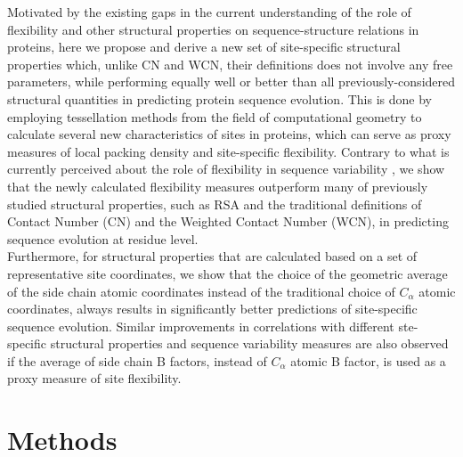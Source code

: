 \documentclass[11pt]{article}
\begin{document}
    Motivated by the existing gaps in the current understanding of the role of flexibility and other structural properties on sequence-structure relations in proteins, here we propose and derive a new set of site-specific structural properties which, unlike CN and WCN, their definitions does not involve any free parameters, while performing equally well or better than all previously-considered structural quantities in predicting protein sequence evolution. This is done by employing tessellation methods from the field of computational geometry to calculate several new characteristics of sites in proteins, which can serve as proxy measures of local packing density and site-specific flexibility. Contrary to what is currently perceived about the role of flexibility in sequence variability \citep[e.g.,][]{huang_mechanistic_2014}, we show that the newly calculated flexibility measures outperform many of previously studied structural properties, such as RSA and the traditional definitions of Contact Number (CN) and the Weighted Contact Number (WCN), in predicting sequence evolution at residue level. \\

    Furthermore, for structural properties that are calculated based on a set of representative site coordinates,  we show that the choice of the geometric average of the side chain atomic coordinates instead of the traditional choice of $C_\alpha$ atomic coordinates, always results in significantly better predictions of site-specific sequence evolution. Similar improvements in correlations with different ste-specific structural properties and sequence variability measures are also observed if the average of side chain B factors, instead of $C_\alpha$ atomic B factor, is used as a proxy measure of site flexibility.


\section{Methods}
\label{sec:methods}
\end{document}
